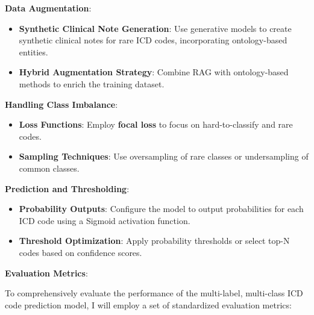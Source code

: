 \documentclass[10pt,a4paper]{article}
\begin{document}
\textbf{Data Augmentation}:
\begin{itemize}
    \item \textbf{Synthetic Clinical Note Generation}: Use generative models to create synthetic clinical notes for rare ICD codes, incorporating ontology-based entities.
    \item \textbf{Hybrid Augmentation Strategy}: Combine RAG with ontology-based methods to enrich the training dataset.
\end{itemize}

\textbf{Handling Class Imbalance}:
\begin{itemize}
    \item \textbf{Loss Functions}: Employ \textbf{focal loss} to focus on hard-to-classify and rare codes.
    \item \textbf{Sampling Techniques}: Use oversampling of rare classes or undersampling of common classes.
\end{itemize}

\textbf{Prediction and Thresholding}:
\begin{itemize}
    \item \textbf{Probability Outputs}: Configure the model to output probabilities for each ICD code using a Sigmoid activation function.
    \item \textbf{Threshold Optimization}: Apply probability thresholds or select top-N codes based on confidence scores.
\end{itemize}

\textbf{Evaluation Metrics}:

To comprehensively evaluate the performance of the multi-label, multi-class ICD code prediction model, I will employ a set of standardized evaluation metrics:
\end{document}
